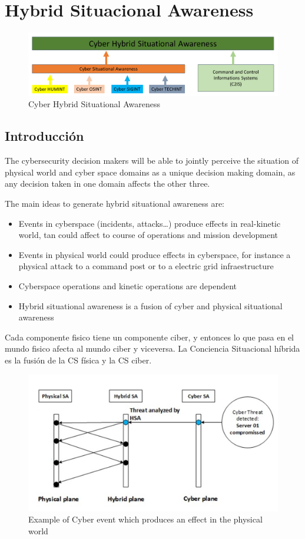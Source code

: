 \chapter{Hybrid Situacional Awareness}

\begin{figure}[htbp]
   \centering
   \includegraphics{images/06/CHSA.png}
   \caption{Cyber Hybrid Situational Awareness}
   \label{fig:06/CHSA}
\end{figure}

\section{Introducción}
The cybersecurity decision makers will be able to jointly perceive the situation of physical world
and cyber space domains as a unique decision making domain, as any decision taken in one
domain affects the other three.

The main ideas to generate hybrid situational awareness are:
\begin{itemize}
	\item Events in cyberspace (incidents, attacks…) produce effects in real-kinetic world, tan could affect to
course of operations and mission development
	\item Events in physical world could produce effects in cyberspace, for instance a physical attack to a
command post or to a electric grid infraestructure
	\item Cyberspace operations and kinetic operations are dependent
	\item Hybrid situational awareness is a fusion of cyber and physical situational awareness
\end{itemize}

Cada componente fisico tiene un componente ciber, y entonces lo que pasa en el mundo fisico afecta al mundo ciber y viceversa.
La Conciencia Situacional híbrida es la fusión de la CS física y la CS ciber.

\begin{figure}[htbp]
   \centering
   \includegraphics{images/06/cyberevent.png}
   \caption{Example of Cyber event which produces an effect in the physical world}
   \label{fig:06/cyberevent}
\end{figure}